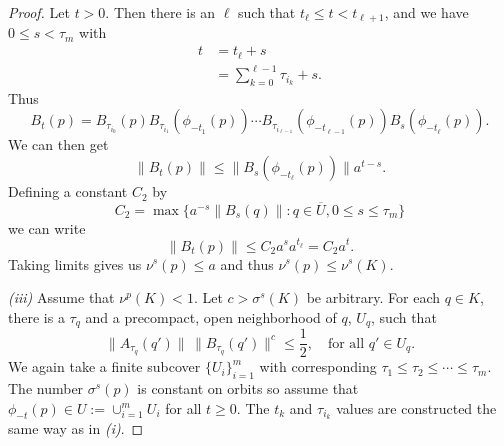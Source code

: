 \begin{proof}
	Let \(t> 0\). Then there is an \(\ell\) such that \(t_\ell \leq t< t_{\ell +1}\), and we have \(0\leq s < \tau_m\) with 
	\begin{equation*}
		\begin{aligned}
			t &= t_\ell + s \\
			&= \sum_{k=0}^{\ell - 1} \tau_{i_k} +s .
		\end{aligned}
	\end{equation*}
	Thus
	\begin{equation*}
		B_t(p) = B_{\tau_{i_0}}(p) B_{\tau_{i_1}}(\phi_{-t_1}(p)) \cdots B_{\tau_{i_{\ell-1}}}(\phi_{-t_{\ell-1}}(p)) B_s(\phi_{-t_\ell}(p)).
	\end{equation*}
	We can then get 
	\begin{equation*}
		\| B_t(p) \| \leq \| B_s(\phi_{-t_\ell}(p)) \| a^{t-s}.
	\end{equation*}
	Defining a constant \(C_2\) by 
	\begin{equation*}
		C_2 = \max\{ a^{-s} \| B_s(q) \| : q\in \overline U , 0 \leq s \leq \tau_m\}
	\end{equation*}
	we can write
	\begin{equation*}
		\|B_t(p) \| \leq C_2 a^s a^{t_\ell} = C_2 a^t.
	\end{equation*}
	Taking limits gives us \(\nu^s(p) \leq a\) and thus \(\nu^s(p) \leq \nu^s(K).\)
	
	\emph{(iii)} Assume that \(\nu^p(K) < 1\). Let \(c > \sigma^s(K)\) be arbitrary. For each \(q\in K\), there is a \(\tau_q\) and a precompact, open neighborhood of \(q\), \(U_q\), such that 
	\begin{equation*}
		\|A_{\tau_q} (q')\|\, \|B_{\tau_q}(q')\|^c \leq \frac 12, \quad \text{for all } q'\in U_q.
	\end{equation*}
	We again take a finite subcover \(\{U_i\}_{i=1}^m\) with corresponding \(\tau_1\leq \tau_2 \leq \cdots \leq \tau_m.\) The number \(\sigma^s(p)\) is constant on orbits so assume that \(\phi_{-t}(p) \in U := \cup_{i=1}^mU_i\) for all \(t\geq 0.\) The \(t_k\) and \(\tau_{i_k}\) values are constructed the same way as in \emph{(i)}.
	

\end{proof}
